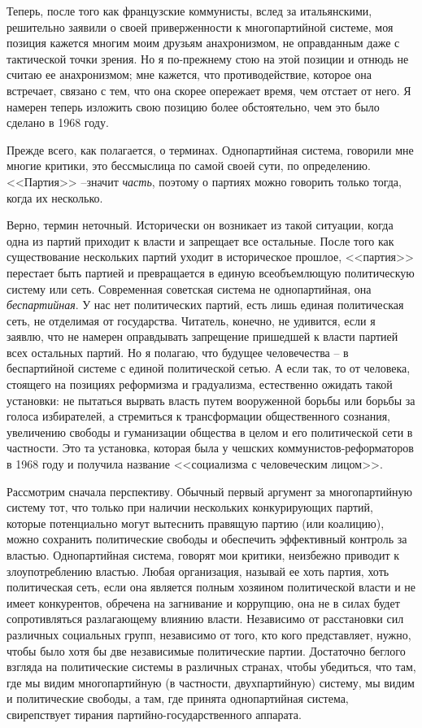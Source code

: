 \documentclass{book}
\begin{document}
Теперь, после того как французские коммунисты, вслед за итальянскими, решительно заявили о своей приверженности к многопартийной системе, моя позиция кажется многим моим друзьям анахронизмом, не оправданным даже с тактической точки зрения. Но я по-прежнему стою на этой позиции и отнюдь не считаю ее анахронизмом; мне кажется, что противодействие, которое она встречает, связано с тем, что она скорее опережает время, чем отстает от него. Я намерен теперь изложить свою позицию более обстоятельно, чем это было сделано в 1968 году.

Прежде всего, как полагается, о терминах. Однопартийная система, говорили мне многие критики, это бессмыслица по са­мой своей сути, по определению. <<Партия>> --значит \textit{часть},  по­этому о партиях можно говорить только тогда, когда их не­сколько.

Верно, термин неточный. Исторически он возникает из такой ситуации, когда одна из партий приходит к власти и запрещает все остальные. После того как существование нескольких пар­тий уходит в историческое прошлое, <<партия>> перестает быть партией и превращается в единую всеобъемлющую политиче­скую систему или сеть. Современная советская система не одно­партийная, она \textit{беспартийная}.  У нас нет политических партий, есть лишь единая политическая сеть, не отделимая от государ­ства. Читатель, конечно, не удивится, если я заявлю, что не наме­рен оправдывать запрещение пришедшей к власти партией всех остальных партий. Но я полагаю, что будущее человечества -- в беспартийной системе с единой политической сетью. А если так, то от человека, стоящего на позициях реформизма и градуализма, естественно ожидать такой установки: не пытаться вырвать власть путем вооруженной борьбы или борьбы за го­лоса избирателей, а стремиться к трансформации общественно­го сознания, увеличению свободы и гуманизации общества в целом 
и его 
политической сети в частности. Это та установка, которая была у чешских коммунистов-реформаторов в 1968 го­ду и получила название <<социализма с человеческим лицом>>.

Рассмотрим сначала перспективу. Обычный первый аргумент за многопартийную систему тот, что только при наличии не­скольких конкурирующих партий, которые потенциально мо­гут вытеснить правящую партию (или коалицию), можно со­хранить политические свободы и обеспечить эффективный контроль за властью. Однопартийная система, говорят мои кри­тики, неизбежно приводит к злоупотреблению властью. Любая организация, называй ее хоть партия, хоть политическая сеть, если она является полным хозяином политической власти и не имеет конкурентов, обречена на загнивание и коррупцию, она не в силах будет сопротивляться разлагающему влиянию власти. Независимо от расстановки сил различных социальных групп, независимо от того, кто кого представляет, нужно, что­бы было хотя бы две независимые политические партии. До­статочно беглого взгляда на политические системы в различных странах, чтобы убедиться, что там, где мы видим многопартий­ную (в частности, двухпартийную) систему, мы видим и поли­тические свободы, а там, где принята 
однопартийная система, свирепствует тирания партийно-государственного аппарата.
\end{document}
